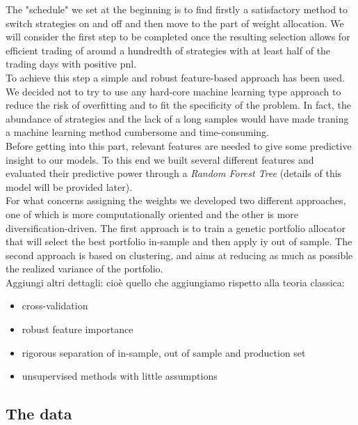 \documentclass[a4paper]{article}
\numberwithin{equation}{subsection}
\begin{document}
The "schedule" we set at the beginning is to find firstly a satisfactory method to switch strategies on and off and then move to the part of weight allocation. We will consider the first step to be completed once the resulting selection allows for efficient trading of around a hundredth of strategies with at least half of the trading days with positive pnl.\\
To achieve this step a simple and robust feature-based approach has been used. We decided not to try to use any hard-core machine learning type approach to reduce the risk of overfitting and to fit the specificity of the problem. In fact, the abundance of strategies and the lack of a long samples would have made traning a machine learning method cumbersome and time-consuming.\\
Before getting into this part, relevant features are needed to give some predictive insight to our models. To this end we built several different features and evaluated their predictive power through a \textit{Random Forest Tree} (details of this model will be provided later).\\
For what concerns assigning the weights we developed two different approaches, one of which is more computationally oriented and the other is more diversification-driven. The first approach is to train a genetic portfolio allocator that will select the best portfolio in-sample and then apply iy out of sample. The second approach is based on clustering, and aims at reducing as much as possible the realized variance of the portfolio.\\

Aggiungi altri dettagli: cioè quello che aggiungiamo rispetto alla teoria classica:
\begin{itemize}
	\item cross-validation
	\item robust feature importance
	\item rigorous separation of in-sample, out of sample and production set
	\item unsupervised methods with little assumptions
\end{itemize}


\subsection{The data}
\end{document}
